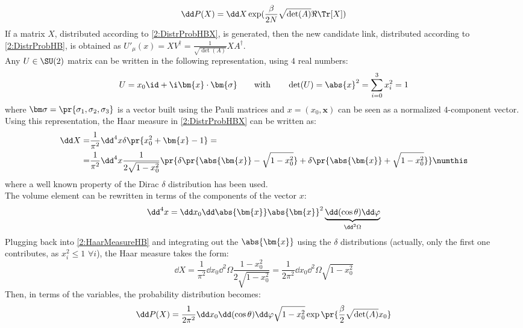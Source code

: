 \begin{equation}
    \dd P(X) = \dd X \exp(\frac\beta{2N}\sqrt{\det(A)}\Re\Tr[X]) \label{2:DistrProbHBX}
\end{equation}
If a matrix $X$, distributed according to \eqref{2:DistrProbHBX}, is generated, then the new candidate link, distributed according to \eqref{2:DistrProbHB}, is obtained as $U'_\mu(x) = XV^\dagger = \frac1{\sqrt{\det(A)}}XA^\dagger$.\\
Any $U\in\SU(2)$ matrix can be written in the following representation, using $4$ real numbers:
\begin{equation}
    U=x_0\id+\i \bm{x} \cdot \bm{\sigma} \qquad\text{with}\qquad \det(U)=\abs{x}^2=\sum_{i=0}^3x_i^2=1 \label{2:SU2Repr}
\end{equation}
where $\bm\sigma=\pr{\sigma_1,\sigma_2,\sigma_3}$ is a vector built using the Pauli matrices and $x=(x_0,\bm{x})$ can be seen as a normalized $4$-component vector.
Using this representation, the Haar measure in \eqref{2:DistrProbHBX} can be written as:
\begin{align*}
    \dd X =& \frac1{\pi^2} \dd^4x \delta\pr{x_0^2+\bm{x}-1} =\\
    =& \frac1{\pi^2} \dd^4x \frac{1}{2\sqrt{1-x_0^2}} \pr{\delta\pr{\abs{\bm{x}}-\sqrt{1-x_0^2}}+\delta\pr{\abs{\bm{x}}+\sqrt{1-x_0^2}}} \numthis\label{2:HaarMeasureHB}
\end{align*}
where a well known property of the Dirac $\delta$ distribution has been used.\\
The volume element can be rewritten in terms of the components of the vector $x$:
\begin{equation}
    \dd^4x = \dd x_0\dd\abs{\bm{x}}\abs{\bm{x}}^2\underbrace{\dd(\cos\theta)\dd\varphi}_{\dd^2\Omega} \label{2:VolumeElemParam}
\end{equation}
Plugging back into \eqref{2:HaarMeasureHB} and integrating out the $\abs{\bm{x}}$ using the $\delta$ distributions (actually, only the first one contributes, as $x_i^2\leq1$ $\forall i$), the Haar measure takes the form:
\begin{equation}
    \dd X = \frac1{\pi^2}\dd x_0\dd^2\Omega\frac{1-x_0^2}{2\sqrt{1-x_0^2}} = \frac1{2\pi^2} \dd x_0 \dd^2\Omega \sqrt{1-x_0^2} \label{2:HaarMeasureHBSimplified}
\end{equation}
Then, in terms of the variables, the probability distribution becomes:
\begin{equation}
    \dd P(X) = \frac1{2\pi^2} \dd x_0 \dd(\cos\theta) \dd\varphi \sqrt{1-x_0^2} \exp\pr{\frac\beta2 \sqrt{\det(A)}x_0} \label{2:DistrProbHBXSimplified}
\end{equation}
